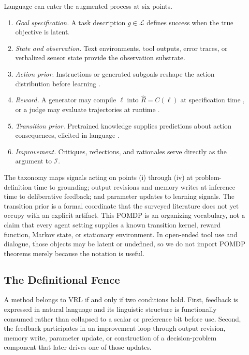 Language can enter the augmented process at six points.
\begin{enumerate}[label=(\roman*),leftmargin=2.2em,itemsep=0.2em]
    \item \emph{Goal specification.} A task description $g\in\mathcal{L}$ defines success when the true objective is latent.
    \item \emph{State and observation.} Text environments, tool outputs, error traces, or verbalized sensor state provide the observation substrate.
    \item \emph{Action prior.} Instructions or generated subgoals reshape the action distribution before learning \citep{he2024words}.
    \item \emph{Reward.} A generator may compile $\ell$ into $\hat R=C(\ell)$ at specification time \citep{ma2024eureka}, or a judge may evaluate trajectories at runtime \citep{zheng2023judging}.
    \item \emph{Transition prior.} Pretrained knowledge supplies predictions about action consequences, elicited in language \citep{he2024words}.
    \item \emph{Improvement.} Critiques, reflections, and rationales serve directly as the argument to $\mathcal{I}$.
\end{enumerate}

The taxonomy maps signals acting on points (i) through (iv) at problem-definition time to grounding; output revisions and memory writes at inference time to deliberative feedback; and parameter updates to learning signals. The transition prior is a formal coordinate that the surveyed literature does not yet occupy with an explicit artifact. This POMDP is an organizing vocabulary, not a claim that every agent setting supplies a known transition kernel, reward function, Markov state, or stationary environment. In open-ended tool use and dialogue, those objects may be latent or undefined, so we do not import POMDP theorems merely because the notation is useful.

\subsection{The Definitional Fence}
\label{subsec:fence}

A method belongs to VRL if and only if two conditions hold. First, feedback is expressed in natural language and its linguistic structure is functionally consumed rather than collapsed to a scalar or preference bit before use. Second, the feedback participates in an improvement loop through output revision, memory write, parameter update, or construction of a decision-problem component that later drives one of those updates.


